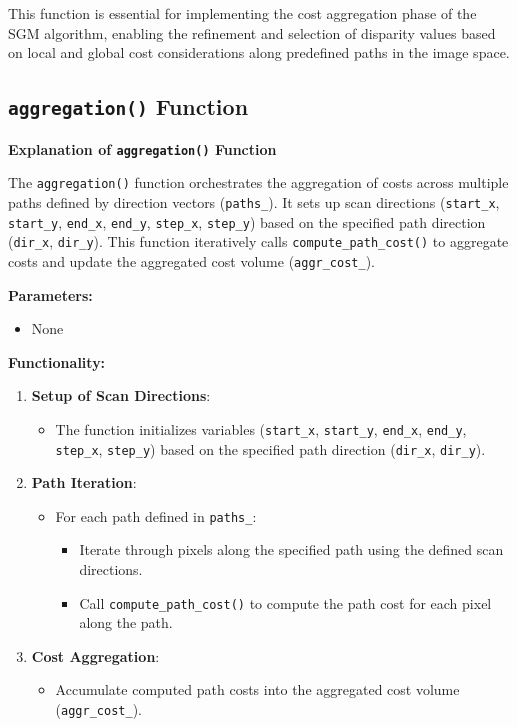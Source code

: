 \documentclass{article}
\begin{document}
This function is essential for implementing the cost aggregation phase of the SGM algorithm, enabling the refinement and selection of disparity values based on local and global cost considerations along predefined paths in the image space.


\subsection{\texttt{aggregation()} Function}
\textbf{Explanation of \texttt{aggregation()} Function}

The \texttt{aggregation()} function orchestrates the aggregation of costs across multiple paths defined by direction vectors (\texttt{paths\_}). It sets up scan directions (\texttt{start\_x}, \texttt{start\_y}, \texttt{end\_x}, \texttt{end\_y}, \texttt{step\_x}, \texttt{step\_y}) based on the specified path direction (\texttt{dir\_x}, \texttt{dir\_y}). This function iteratively calls \texttt{compute\_path\_cost()} to aggregate costs and update the aggregated cost volume (\texttt{aggr\_cost\_}).

\textbf{Parameters:}
\begin{itemize}
    \item None
\end{itemize}

\textbf{Functionality:}
\begin{enumerate}
    \item \textbf{Setup of Scan Directions}:
        \begin{itemize}
            \item The function initializes variables (\texttt{start\_x}, \texttt{start\_y}, \texttt{end\_x}, \texttt{end\_y}, \texttt{step\_x}, \texttt{step\_y}) based on the specified path direction (\texttt{dir\_x}, \texttt{dir\_y}).
        \end{itemize}
    
    \item \textbf{Path Iteration}:
        \begin{itemize}
            \item For each path defined in \texttt{paths\_}:
                \begin{itemize}
                    \item Iterate through pixels along the specified path using the defined scan directions.
                    \item Call \texttt{compute\_path\_cost()} to compute the path cost for each pixel along the path.
                \end{itemize}
        \end{itemize}
    
    \item \textbf{Cost Aggregation}:
        \begin{itemize}
            \item Accumulate computed path costs into the aggregated cost volume (\texttt{aggr\_cost\_}).
        \end{itemize}
\end{enumerate}
\end{document}
